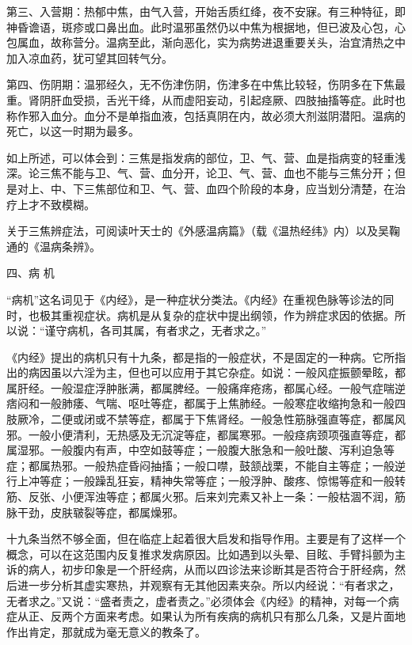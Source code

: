 \documentclass[a4paper,12pt,UTF8,twoside]{ctexbook}
\begin{document}
第三、入营期：热郁中焦，由气入营，开始舌质红绛，夜不安寐。有三种特征，即神昏谵语，斑疹或口鼻出血。此时温邪虽然仍以中焦为根据地，但已波及心包，心包属血，故称营分。温病至此，渐向恶化，实为病势进退重要关头，治宜清热之中加入凉血药，犹可望其回转气分。

第四、伤阴期：温邪经久，无不伤津伤阴，伤津多在中焦比较轻，伤阴多在下焦最重。肾阴肝血受损，舌光干绛，从而虚阳妄动，引起痉厥、四肢抽搐等症。此时也称作邪入血分。血分不是单指血液，包括真阴在内，故必须大剂滋阴潜阳。温病的死亡，以这一时期为最多。

如上所述，可以体会到：三焦是指发病的部位，卫、气、营、血是指病变的轻重浅深。论三焦不能与卫、气、营、血分开，论卫、气、营、血也不能与三焦分开；但是对上、中、下三焦部位和卫、气、营、血四个阶段的本身，应当划分清楚，在治疗上才不致模糊。

关于三焦辨症法，可阅读叶天士的《外感温病篇》（载《温热经纬》内）以及吴鞠通的《温病条辨》。

四、病 机

“病机”这名词见于《内经》，是一种症状分类法。《内经》在重视色脉等诊法的同时，也极其重视症状。病机是从复杂的症状中提出纲领，作为辨症求因的依据。所以说：“谨守病机，各司其属，有者求之，无者求之。”

《内经》提出的病机只有十九条，都是指的一般症状，不是固定的一种病。它所指出的病因虽以六淫为主，但也可以应用于其它杂症。如说：一般风症振颤晕眩，都属肝经。一般湿症浮肿胀满，都属脾经。一般痛痒疮疡，都属心经。一般气症喘逆痞闷和一般肺痿、气喘、呕吐等症，都属于上焦肺经。一般寒症收缩拘急和一般四肢厥冷，二便或闭或不禁等症，都属于下焦肾经。一般急性筋脉强直等症，都属风邪。一般小便清利，无热感及无沉淀等症，都属寒邪。一般痉病颈项强直等症，都属湿邪。一般腹内有声，中空如鼓等症；一般腹大胀急和一般吐酸、泻利迫急等症；都属热邪。一般热症昏闷抽搐；一般口噤，鼓颔战栗，不能自主等症；一般逆行上冲等症；一般躁乱狂妄，精神失常等症；一般浮肿、酸疼、惊惕等症和一般转筋、反张、小便浑浊等症；都属火邪。后来刘完素又补上一条：一般枯涸不润，筋脉干劲，皮肤皲裂等症，都属燥邪。

十九条当然不够全面，但在临症上起着很大启发和指导作用。主要是有了这样一个概念，可以在这范围内反复推求发病原因。比如遇到以头晕、目眩、手臂抖颤为主诉的病人，初步印象是一个肝经病，从而以四诊法来诊断其是否符合于肝经病，然后进一步分析其虚实寒热，并观察有无其他因素夹杂。所以内经说：“有者求之，无者求之。”又说：“盛者责之，虚者责之。”必须体会《内经》的精神，对每一个病症从正、反两个方面来考虑。如果认为所有疾病的病机只有那么几条，又是片面地作出肯定，那就成为毫无意义的教条了。
\end{document}
